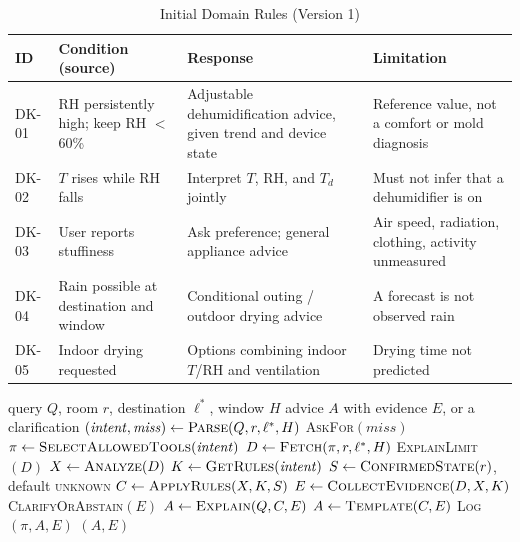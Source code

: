 \begin{table}[t]
\caption{Initial Domain Rules (Version 1)}
\label{tab:rules}
\centering
\footnotesize
\setlength{\tabcolsep}{3pt}
\begin{tabular}{@{}>{\raggedright}p{0.85cm}>{\raggedright}p{2.45cm}>{\raggedright}p{2.15cm}>{\raggedright\arraybackslash}p{2.45cm}@{}}
\toprule
ID & Condition (source) & Response & Limitation \\
\midrule
DK-01 & RH persistently high; keep RH $<$60\%~\cite{epa_mold} & Adjustable dehumidification advice, given trend and device state & Reference value, not a comfort or mold diagnosis \\
DK-02 & $T$ rises while RH falls~\cite{nws_dewpoint} & Interpret $T$, RH, and $T_d$ jointly & Must not infer that a dehumidifier is on \\
DK-03 & User reports stuffiness~\cite{ashrae55,mishra2026myths} & Ask preference; general appliance advice & Air speed, radiation, clothing, activity unmeasured \\
DK-04 & Rain possible at destination and window~\cite{cwa_township} & Conditional outing / outdoor drying advice & A forecast is not observed rain \\
DK-05 & Indoor drying requested & Options combining indoor $T$/RH and ventilation & Drying time not predicted \\
\bottomrule
\end{tabular}
\end{table}

\begin{algorithm}[t]
\caption{Advice Path}
\label{alg:advice}
\small
\begin{algorithmic}[1]
\Require query $Q$, room $r$, destination $\ell^\ast$, window $H$
\Ensure advice $A$ with evidence $E$, or a clarification
\State $(\mathit{intent},\mathit{miss})\gets\textsc{Parse}(Q,r,\ell^\ast,H)$ 
 \Return \textsc{AskFor}$(\mathit{miss})$ \EndIf
\State $\pi\gets\textsc{SelectAllowedTools}(\mathit{intent})$ 
\State $D\gets\textsc{Fetch}(\pi,r,\ell^\ast,H)$ 
 \Return \textsc{ExplainLimit}$(D)$ \EndIf
\State $X\gets\textsc{Analyze}(D)$ 
\State $K\gets\textsc{GetRules}(\mathit{intent})$ 
\State $S\gets\textsc{ConfirmedState}(r)$, default \textsc{unknown}
\State $C\gets\textsc{ApplyRules}(X,K,S)$ 
\State $E\gets\textsc{CollectEvidence}(D,X,K)$
 \Return \textsc{ClarifyOrAbstain}$(E)$ \EndIf
\State $A\gets\textsc{Explain}(Q,C,E)$ 
 $A\gets\textsc{Template}(C,E)$ \EndIf
\State \textsc{Log}$(\pi,A,E)$
\State \Return $(A,E)$
\end{algorithmic}
\end{algorithm}


